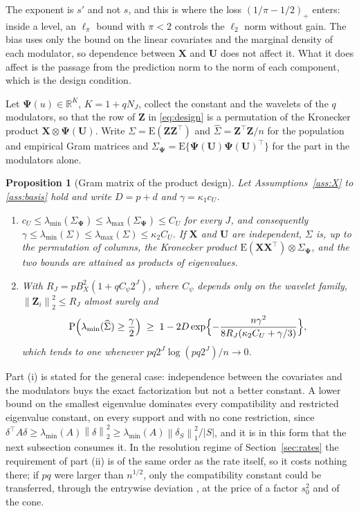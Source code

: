 \documentclass[12pt]{article} %
\newtheorem{proposition}{Proposition}
\theoremstyle{definition}
\newcommand{\R}{\mathbb{R}}
\newcommand{\E}{\mathrm{E}}
\newcommand{\Prob}{\mathrm{P}}
\newcommand{\T}{^{\top}}
\newcommand{\norm}[1]{\left\lVert #1 \right\rVert}
\newcommand{\NJ}{N_{J}}
\newcommand{\bX}{\mathbf{X}}
\newcommand{\bU}{\mathbf{U}}
\newcommand{\bZ}{\mathbf{Z}}
\newcommand{\Gram}{\Sigma}
\newcommand{\Gramhat}{\widehat{\Sigma}}
\newcommand{\seff}{s'}
\newcommand{\bPsi}{\boldsymbol{\Psi}}
\newcommand{\lmin}{\lambda_{\min}}
\newcommand{\lmaxx}{\lambda_{\max}}
\begin{document}
The exponent is $\seff$ and not $s$, and this is where the loss
$(1/\pi-1/2)_{+}$ enters: inside a level, an $\ell_\pi$ bound with $\pi < 2$
controls the $\ell_2$ norm without gain. The bias uses only the bound on the
linear covariates and the marginal density of each modulator, so dependence
between $\bX$ and $\bU$ does not affect it. What it does affect is the passage
from the prediction norm to the norm of each component, which is the design
condition.

Let $\bPsi(u) \in \R^{K}$, $K = 1 + q\NJ$, collect the constant and the
wavelets of the $q$ modulators, so that the row of $\bZ$ in
\eqref{eq:design} is a permutation of the Kronecker product
$\bX \otimes \bPsi(\bU)$. Write $\Gram = \E(\bZ\bZ\T)$ and
$\Gramhat = \bZ\T\bZ/n$ for the population and empirical Gram matrices and
$\Gram_{\bPsi} = \E\{\bPsi(\bU)\bPsi(\bU)\T\}$ for the part in the modulators
alone.

\begin{proposition}[Gram matrix of the product design]
\label{prop:gram}
Let Assumptions~\ref{ass:X} to \ref{ass:basis} hold and write $D = p + d$ and
$\gamma = \kappa_1 c_U$.
\begin{enumerate}
\item[(i)] $c_U \le \lmin(\Gram_{\bPsi}) \le \lmaxx(\Gram_{\bPsi}) \le C_U$
for every $J$, and consequently
$\gamma \le \lmin(\Gram) \le \lmaxx(\Gram) \le \kappa_2 C_U$. If $\bX$ and
$\bU$ are independent, $\Gram$ is, up to the permutation of columns, the
Kronecker product $\E(\bX\bX\T)\otimes\Gram_{\bPsi}$, and the two bounds are
attained as products of eigenvalues.
\item[(ii)] With $R_J = pB_X^{2}(1 + qC_\psi 2^{J})$, where $C_\psi$ depends
only on the wavelet family, $\norm{\bZ_i}_2^{2} \le R_J$ almost surely and
\[
  \Prob\Bigl(\lmin(\Gramhat) \ge \frac{\gamma}{2}\Bigr)
  \;\ge\; 1 - 2D\exp\Bigl\{-\frac{n\gamma^{2}}
  {8R_J(\kappa_2C_U + \gamma/3)}\Bigr\},
\]
which tends to one whenever $pq2^{J}\log(pq2^{J})/n \to 0$.
\end{enumerate}
\end{proposition}

Part (i) is stated for the general case: independence between the covariates
and the modulators buys the exact factorization but not a better constant. A
lower bound on the smallest eigenvalue dominates every compatibility and
restricted eigenvalue constant, on every support and with no cone restriction,
since $\delta\T A \delta \ge \lmin(A)\norm{\delta}_2^2 \ge
\lmin(A)\norm{\delta_S}_1^2/|S|$, and it is in this form that the next
subsection consumes it. In the resolution regime of Section~\ref{sec:rates}
the requirement of part (ii) is of the same order as the rate itself, so it
costs nothing there; if $pq$ were larger than $n^{1/2}$, only the
compatibility constant could be transferred, through the entrywise deviation
\citep[Corollary 6.8]{buhlmann2011statistics}, at the price of a factor
$s_0^{2}$ and of the cone.
\end{document}
